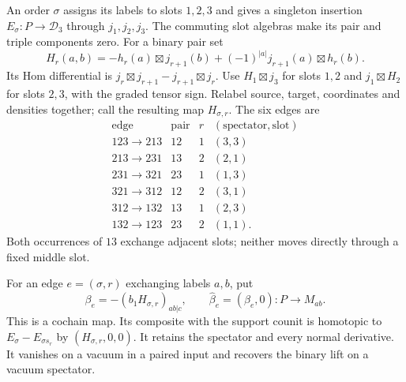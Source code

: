 An order $\sigma$ assigns its labels to slots $1,2,3$ and gives
a singleton insertion $E_\sigma:P\to\mathcal D_3$ through
$j_1,j_2,j_3$. The commuting slot algebras make its pair and
triple components zero. For a binary pair set
\[
 H_r(a,b)=-h_r(a)\boxtimes j_{r+1}(b)
                 +(-1)^{|a|}j_{r+1}(a)\boxtimes h_r(b).
\]
Its Hom differential is
$j_r\boxtimes j_{r+1}-j_{r+1}\boxtimes j_r$.
Use $H_1\boxtimes j_3$ for slots $1,2$ and
$j_1\boxtimes H_2$ for slots $2,3$, with the graded tensor
sign. Relabel source, target, coordinates and densities
together; call the resulting map $H_{\sigma,r}$.
The six edges are
\begin{equation}\label{eq:vol2-supported-hexagon-edges}
 \begin{array}{c|c|c|c}
 \text{edge}&\text{pair}&r&(\text{spectator},\text{slot})\\\hline
 123\to213&12&1&(3,3)\\
 213\to231&13&2&(2,1)\\
 231\to321&23&1&(1,3)\\
 321\to312&12&2&(3,1)\\
 312\to132&13&1&(2,3)\\
 132\to123&23&2&(1,1).
 \end{array}
\end{equation}
Both occurrences of $13$ exchange adjacent slots; neither
moves directly through a fixed middle slot.

\begin{proposition}\label{prop:vol2-supported-pair-lifts}
For an edge $e=(\sigma,r)$ exchanging labels $a,b$, put
\[
 \beta_e=-(b_1H_{\sigma,r})_{ab|c},\qquad
 \widehat\beta_e=(\beta_e,0):P\longrightarrow M_{ab}.
\]
This is a cochain map. Its composite with the support counit
is homotopic to $E_\sigma-E_{\sigma s_r}$ by
$(H_{\sigma,r},0,0)$. It retains the spectator and every normal
derivative. It vanishes on a vacuum in a paired input and
recovers the binary lift on a vacuum spectator.
\end{proposition}

